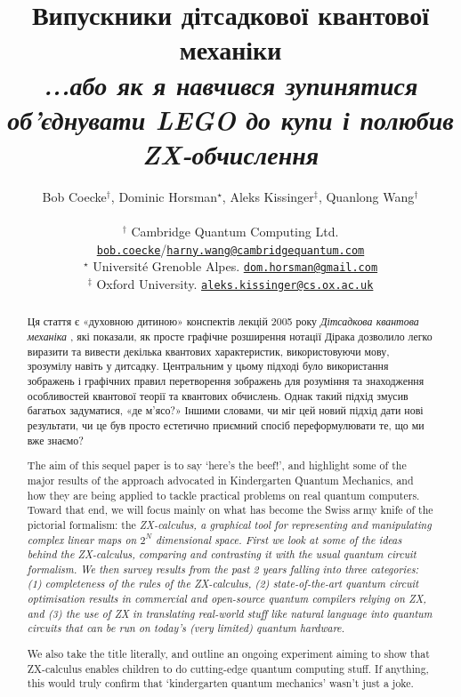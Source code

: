 \documentclass[11pt]{article}
\title{Випускники дітсадкової квантової механіки\vspace{2mm}
\\ \large\it ...або як я навчився зупинятися об'єднувати LEGO до купи і полюбив ZX-обчислення}
\author{Bob Coecke${}^\dagger$, Dominic Horsman${}^\star$, Aleks Kissinger${}^\ddagger$, Quanlong Wang${}^\dagger$\\
\ \\ 
${}^\dagger$ Cambridge Quantum Computing Ltd. \\ \href{mailto:bob.coecke@cambridgequantum.com}{\tt bob.coecke}/\href{mailto:harny.wang@cambridgequantum.com}{\tt harny.wang@cambridgequantum.com} \\
${}^\star$ Universit\'e Grenoble Alpes. \href{mailto:dom.horsman@gmail.com}{\tt dom.horsman@gmail.com}\\
${}^\ddagger$ Oxford University. \href{mailto:aleks.kissinger@cs.ox.ac.uk}{\tt aleks.kissinger@cs.ox.ac.uk}
}
\theoremstyle{definition}
\def\bR{\begin{color}{red}}
\def\e{\end{color}\xspace}
\newcommand{\TODOb}[1]{\marginpar{\scriptsize\bR \textbf{TODO:} #1\e}}
\begin{document}
  
\maketitle 

\begin{abstract} 
Ця стаття є «духовною дитиною» конспектів лекцій 2005 року \textit{Дітсадкова квантова механіка} \cite{Kindergarten}, які показали, як просте графічне розширення нотації Дірака дозволило легко виразити та вивести декілька квантових характеристик, використовуючи мову, зрозумілу навіть у дитсадку. Центральним у цьому підході було використання зображень і графічних правил перетворення зображень для розуміння та знаходження особливостей квантової теорії та квантових обчислень. Однак такий підхід змусив багатьох задуматися, «де м'ясо?» Іншими словами, чи міг цей новий підхід дати нові результати, чи це був просто естетично приємний спосіб переформулювати те, що ми вже знаємо?

The aim of this sequel paper is to say `here's the beef!', and highlight some of the major results of the approach advocated in Kindergarten Quantum Mechanics, and how they are being applied to tackle practical problems on real quantum computers. Toward that end, we will focus mainly on what has become the Swiss army knife of the pictorial formalism: the \em ZX-calculus\em, a graphical tool for representing and manipulating complex linear maps on $2^N$ dimensional space. First we look at  
some of the ideas behind the ZX-calculus,  comparing and contrasting it with the usual quantum circuit formalism.
We then survey results from the past 2 years falling into three categories:
(1) completeness of the  rules of the ZX-calculus, (2) state-of-the-art quantum circuit optimisation results in commercial and open-source quantum compilers relying on ZX, and (3) the use of ZX in translating real-world stuff like natural language into quantum circuits  that can be run on today's (very limited) quantum hardware.

We also take the title literally, and outline an ongoing experiment aiming to show that ZX-calculus enables children to do cutting-edge quantum computing stuff. If anything, this would truly confirm that `kindergarten quantum mechanics' wasn't just a joke.
\end{abstract}
\end{document}
